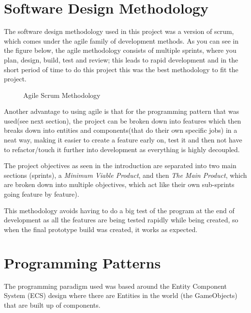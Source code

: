 \documentclass[11pt]{report}
\begin{document}
\section{Software Design Methodology}
The software design methodology used in this project was a version of scrum, which comes under the agile family of development methods. As you can see in the figure below\cite{AgileMethodology}, the agile methodology consists of multiple sprints, where you plan, design, build, test and review; this leads to rapid development and in the short period of time to do this project this was the best methodology to fit the project. 
\begin{figure}[H]
    \centering
    \caption{Agile Scrum Methodology}
\end{figure}
Another advantage to using agile is that for the programming pattern that was used(see next section), the project can be broken down into features which then breaks down into entities and components(that do their own specific jobs) in a neat way, making it easier to create a feature early on, test it and then not have to refactor/touch it further into development as everything is highly decoupled. 

The project objectives as seen in the introduction are separated into two main sections (sprints), a \textit{Minimum Viable Product}, and then \textit{The Main Product}, which are broken down into multiple objectives, which act like their own sub-sprints going feature by feature).  

This methodology avoids having to do a big test of the program at the end of development as all the features are being tested rapidly while being created, so when the final prototype build was created, it works as expected.

\section{Programming Patterns}
The programming paradigm used was based around the Entity Component System (ECS) design where there are Entities in the world (the GameObjects) that are built up of components.
\end{document}
